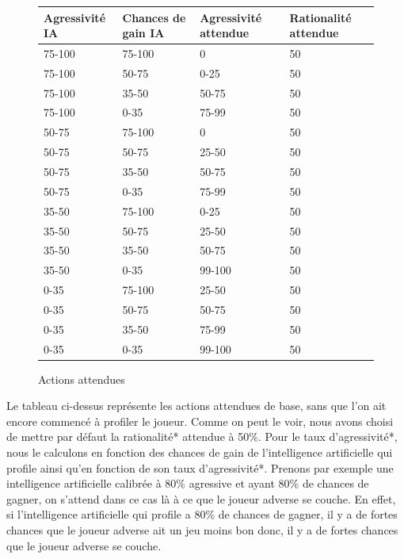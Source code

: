 \documentclass{report}
\begin{document}
\begin{figure}[H]
\begin{center}
\begin{tabular}{|l|l|l|l|}
	\hline
   Agressivité IA & Chances de gain IA & Agressivité attendue & Rationalité attendue\\
   \hline
   75-100 & 75-100 & 0 & 50\\
   \hline
   75-100 & 50-75 & 0-25 & 50\\
   \hline
   75-100 & 35-50 & 50-75 & 50\\
   \hline
   75-100 & 0-35 & 75-99 & 50\\
   \hline
   50-75 & 75-100 & 0 & 50\\
   \hline
   50-75 & 50-75 & 25-50 & 50\\
   \hline
   50-75 & 35-50 & 50-75 & 50\\
   \hline
   50-75 & 0-35 & 75-99 & 50\\
   \hline
   35-50 & 75-100 & 0-25 & 50\\
   \hline
   35-50 & 50-75 & 25-50 & 50\\
   \hline
   35-50 & 35-50 & 50-75 & 50\\
   \hline
   35-50 & 0-35 & 99-100 & 50\\
   \hline
   0-35	 & 75-100 & 25-50 & 50\\
   \hline
   0-35 & 50-75 & 50-75 & 50\\
   \hline
   0-35 & 35-50 & 75-99 & 50\\
   \hline
   0-35 & 0-35 & 99-100 & 50\\
   \hline
\end{tabular}	
\end{center}
\caption{Actions attendues}
\end{figure}

Le tableau ci-dessus représente les actions attendues de base, sans que l'on ait encore commencé à profiler le joueur. Comme on peut le voir, nous avons choisi de mettre par défaut la rationalité* attendue à 50\%. Pour le taux d'agressivité*, nous le calculons en fonction des chances de gain de l'intelligence artificielle qui profile ainsi qu'en fonction de son taux d'agressivité*. Prenons par exemple une intelligence artificielle calibrée à 80\% agressive et ayant 80\% de chances de gagner, on s'attend dans ce cas là à ce que le joueur adverse se couche. En effet, si l'intelligence artificielle qui profile a 80\% de chances de gagner, il y a de fortes chances que le joueur adverse ait un jeu moins bon donc, il y a de fortes chances que le joueur adverse se couche.\\
\end{document}
